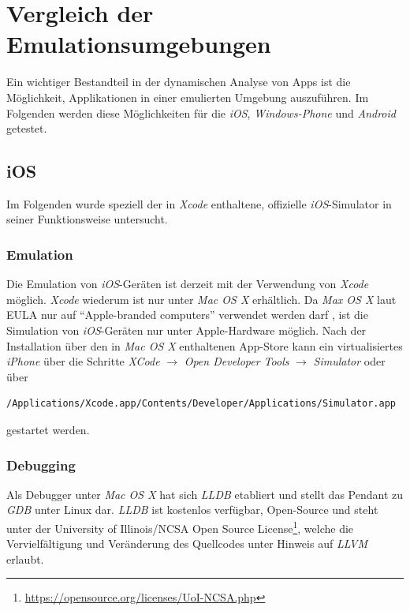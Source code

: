\newpage
\section{Vergleich der Emulationsumgebungen}\label{ref:VerglAktSitEmu}
Ein wichtiger Bestandteil in der dynamischen Analyse von Apps ist die Möglichkeit, Applikationen in einer emulierten Umgebung auszuführen. Im Folgenden werden diese Möglichkeiten für die \textit{iOS}, \textit{Windows-Phone} und \textit{Android} getestet.
 
	\subsection{iOS}
	Im Folgenden wurde speziell der in \textit{Xcode} enthaltene, offizielle \textit{iOS}-Simulator in seiner Funktionsweise untersucht.
	
			\subsubsection{Emulation}\label{ref:emulation}
			Die Emulation von \textit{iOS}-Geräten ist derzeit mit der Verwendung von \textit{Xcode} möglich. \textit{Xcode} wiederum ist nur unter \textit{Mac OS X} erhältlich. Da \textit{Max OS X} laut EULA nur auf "`Apple-branded computers"' verwendet werden darf \cite{AppleEULA}, ist die Simulation von \textit{iOS}-Geräten nur unter Apple-Hardware möglich. Nach der Installation über den in \textit{Mac OS X} enthaltenen App-Store kann ein virtualisiertes \textit{iPhone} über die Schritte \textit{XCode} $\rightarrow$ \textit{Open Developer Tools} $\rightarrow$ \textit{Simulator} oder über 
\begin{lstlisting}
/Applications/Xcode.app/Contents/Developer/Applications/Simulator.app
\end{lstlisting}			
gestartet werden.\\
			
		\subsubsection{Debugging}
Als Debugger unter \textit{Mac OS X} hat sich \textit{LLDB} etabliert und stellt das Pendant zu \textit{GDB} unter Linux dar. \textit{LLDB} ist kostenlos verfügbar, Open-Source und steht unter der University of Illinois/NCSA Open Source License\footnote{\url{https://opensource.org/licenses/UoI-NCSA.php}}, welche die Vervielfältigung und Veränderung des Quellcodes unter Hinweis auf \textit{LLVM} erlaubt.\\

